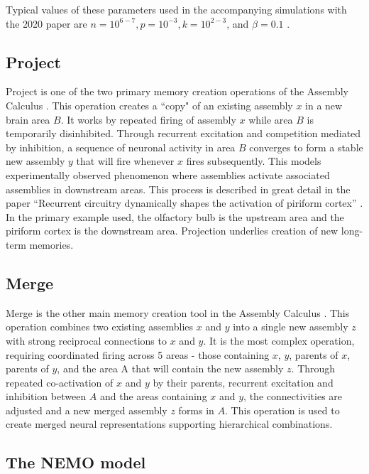 Typical values of these parameters used in the accompanying simulations with the 2020 paper are $n = 10^{6-7} , p = 10^{-3}, k = 10^{2-3}$, and $\beta = 0.1$ \cite{papadimitriou2020brain}.

\subsection{Project}

Project is one of the two primary memory creation operations of the Assembly Calculus \cite{papadimitriou2020brain}. This operation creates a ``copy" of an existing assembly $x$ in a new brain area $B$. It works by repeated firing of assembly $x$ while area $B$ is temporarily disinhibited. Through recurrent excitation and competition mediated by inhibition, a sequence of neuronal activity in area $B$ converges to form a stable new assembly $y$ that will fire whenever $x$ fires subsequently. This models experimentally observed phenomenon where assemblies activate associated assemblies in downstream areas. This process is described in great detail in the paper ``Recurrent circuitry dynamically shapes the activation of piriform cortex'' \cite{franks2011recurrent}. In the primary example used, the olfactory bulb is the upstream area and the piriform cortex is the downstream area. Projection underlies creation of new long-term memories.

\subsection{Merge}

Merge is the other main memory creation tool in the Assembly Calculus \cite{papadimitriou2020brain}. This operation combines two existing assemblies $x$ and $y$ into a single new assembly $z$ with strong reciprocal connections to $x$ and $y$. It is the most complex operation, requiring coordinated firing across 5 areas - those containing $x$, $y$, parents of $x$, parents of $y$, and the area A that will contain the new assembly $z$. Through repeated co-activation of $x$ and $y$ by their parents, recurrent excitation and inhibition between $A$ and the areas containing $x$ and $y$, the connectivities are adjusted and a new merged assembly $z$ forms in $A$. This operation is used to create merged neural representations supporting hierarchical combinations.

\subsection{The NEMO model}

